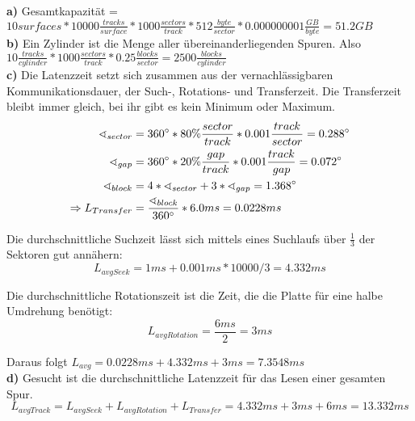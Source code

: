 \documentclass[12pt]{article}
\begin{document}
\textbf{a)} Gesamtkapazität = $10 surfaces * 10000 \frac{tracks}{surface} *
1000 \frac{sectors}{track} * 512 \frac{byte}{sector} * 0.000000001
\frac{GB}{byte} = 51.2GB$
\\[1em]
\textbf{b)} Ein Zylinder ist die Menge aller übereinanderliegenden Spuren.
Also $10 \frac{tracks}{cylinder} * 1000 \frac{sectors}{track} * 0.25
\frac{blocks}{sector} = 2500\frac{blocks}{cylinder}$
\\[1em]
\textbf{c)}  Die Latenzzeit setzt sich zusammen aus der vernachlässigbaren
Kommunikationsdauer, der Such-, Rotations- und Transferzeit. Die Transferzeit
bleibt immer gleich, bei ihr gibt es kein Minimum oder Maximum.
\begin{align*}
    \sphericalangle_{sector} &= 360\degree * 80\% \frac{sector}{track} * 0.001\frac{track}{sector} = 0.288\degree\\
    \sphericalangle_{gap} &= 360\degree * 20\% \frac{gap}{track} * 0.001\frac{track}{gap} = 0.072\degree\\
    \sphericalangle_{block} &= 4 * \sphericalangle_{sector} + 3 * \sphericalangle_{gap} = 1.368\degree\\
    \Rightarrow L_{Transfer} &= \frac{\sphericalangle_{block}}{360\degree} * 6.0ms = 0.0228ms
\end{align*}

Die durchschnittliche Suchzeit lässt sich mittels eines Suchlaufs über
$\frac{1}{3}$ der Sektoren gut annähern:
$$L_{avgSeek} = 1ms + 0.001ms * 10000/3 = 4.332ms$$

Die durchschnittliche Rotationszeit ist die Zeit, die die Platte für eine halbe
Umdrehung benötigt:
$$L_{avgRotation} = \frac{6ms}{2} = 3ms$$

Daraus folgt $L_{avg} = 0.0228ms + 4.332ms + 3ms = 7.3548ms$
\\[1em]
\textbf{d)} Gesucht ist die durchschnittliche Latenzzeit für das Lesen einer gesamten Spur.
$$L_{avgTrack} = L_{avgSeek} + L_{avgRotation} + L_{Transfer} = 4.332ms + 3ms + 6ms = 13.332ms$$
\end{document}
